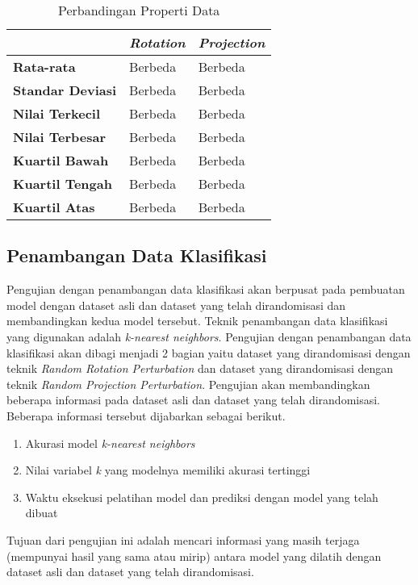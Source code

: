 \begin{table}
	\centering
	\caption{Perbandingan Properti Data}
	\begin{tabular}{|l|l|l|}
		\hline
		& \textbf{\textit{Rotation}} & \textbf{\textit{Projection}} \\ \hline
		\textbf{Rata-rata} & Berbeda & Berbeda \\
		\textbf{Standar Deviasi} & Berbeda & Berbeda \\
		\textbf{Nilai Terkecil} & Berbeda & Berbeda \\
		\textbf{Nilai Terbesar} & Berbeda & Berbeda \\
		\textbf{Kuartil Bawah} & Berbeda & Berbeda \\
		\textbf{Kuartil Tengah} & Berbeda & Berbeda \\
		\textbf{Kuartil Atas} & Berbeda & Berbeda \\
		\hline
	\end{tabular}
	\label{table:perbandingan-properti}
\end{table}

\subsection{Penambangan Data Klasifikasi}
\label{subsec:pengujian-klasifikasi}
Pengujian dengan penambangan data klasifikasi akan berpusat pada pembuatan model dengan dataset asli dan dataset yang telah dirandomisasi dan membandingkan kedua model tersebut. Teknik penambangan data klasifikasi yang digunakan adalah \textit{k-nearest neighbors}. Pengujian dengan penambangan data klasifikasi akan dibagi menjadi 2 bagian yaitu dataset yang dirandomisasi dengan teknik \textit{Random Rotation Perturbation} dan dataset yang dirandomisasi dengan teknik \textit{Random Projection Perturbation}. Pengujian akan membandingkan beberapa informasi pada dataset asli dan dataset yang telah dirandomisasi. Beberapa informasi tersebut dijabarkan sebagai berikut.
\begin{enumerate}
	\item Akurasi model \textit{k-nearest neighbors}
	\item Nilai variabel \textit{k} yang modelnya memiliki akurasi tertinggi
	\item Waktu eksekusi pelatihan model dan prediksi dengan model yang telah dibuat
\end{enumerate}
Tujuan dari pengujian ini adalah mencari informasi yang masih terjaga (mempunyai hasil yang sama atau mirip) antara model yang dilatih dengan dataset asli dan dataset yang telah dirandomisasi.

